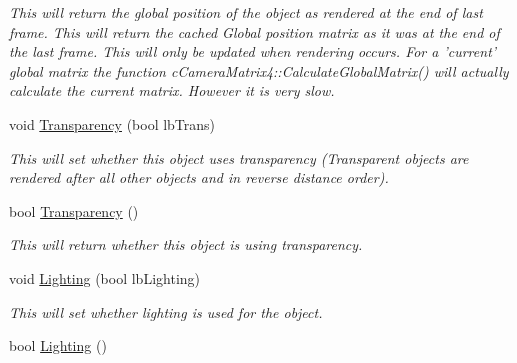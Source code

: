 \begin{DoxyCompactItemize}
\begin{DoxyCompactList}\small\item\em This will return the global position of the object as rendered at the end of last frame. This will return the cached Global position matrix as it was at the end of the last frame. This will only be updated when rendering occurs. For a 'current' global matrix the function cCameraMatrix4::CalculateGlobalMatrix() will actually calculate the current matrix. However it is very slow. \end{DoxyCompactList}\item 
\hypertarget{classc_render_object_a2c8ef4ef4f7a005caae010b3e287a588}{
void \hyperlink{classc_render_object_a2c8ef4ef4f7a005caae010b3e287a588}{Transparency} (bool lbTrans)}
\label{classc_render_object_a2c8ef4ef4f7a005caae010b3e287a588}

\begin{DoxyCompactList}\small\item\em This will set whether this object uses transparency (Transparent objects are rendered after all other objects and in reverse distance order). \end{DoxyCompactList}\item 
\hypertarget{classc_render_object_a740268aff52c1fa6cc5fde5122da35fa}{
bool \hyperlink{classc_render_object_a740268aff52c1fa6cc5fde5122da35fa}{Transparency} ()}
\label{classc_render_object_a740268aff52c1fa6cc5fde5122da35fa}

\begin{DoxyCompactList}\small\item\em This will return whether this object is using transparency. \end{DoxyCompactList}\item 
\hypertarget{classc_render_object_a67191d0fe8aceaa10052a542b3c34650}{
void \hyperlink{classc_render_object_a67191d0fe8aceaa10052a542b3c34650}{Lighting} (bool lbLighting)}
\label{classc_render_object_a67191d0fe8aceaa10052a542b3c34650}

\begin{DoxyCompactList}\small\item\em This will set whether lighting is used for the object. \end{DoxyCompactList}\item 
\hypertarget{classc_render_object_a11fd3f36150b07198b069d8d9461b370}{
bool \hyperlink{classc_render_object_a11fd3f36150b07198b069d8d9461b370}{Lighting} ()}
\label{classc_render_object_a11fd3f36150b07198b069d8d9461b370}


\end{DoxyCompactItemize}
